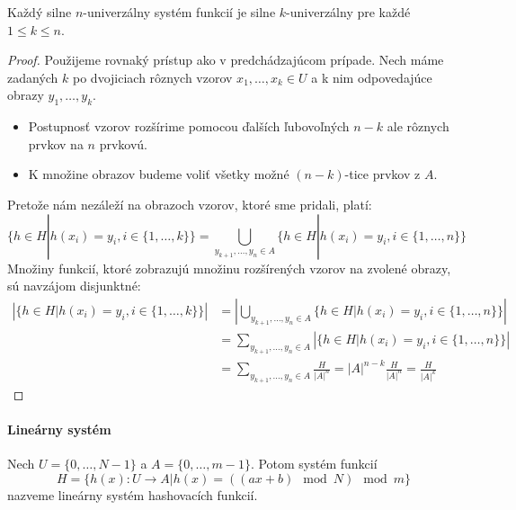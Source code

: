 \begin{remark}
Každý silne $n$-univerzálny systém funkcií je silne $k$-univerzálny pre každé $1 \leq k \leq n$.
\end{remark}
\begin{proof}
Použijeme rovnaký prístup ako v predchádzajúcom prípade. Nech máme zadaných $k$ po dvojiciach rôznych vzorov $x_1, \dots, x_k \in U$ a k nim odpovedajúce obrazy $y_1, \dots, y_k$. 
\begin{itemize}
\item Postupnosť vzorov rozšírime pomocou ďalších ľubovoľných $n - k$ ale rôznych prvkov na $n$ prvkovú. 
\item K množine obrazov budeme voliť všetky možné $(n-k)$-tice prvkov z $A$. 
\end{itemize}
Pretože nám nezáleží na obrazoch vzorov, ktoré sme pridali, platí:
\begin{displaymath}
\lbrace h \in H | h(x_i) = y_i, i \in \lbrace 1, \dots, k \rbrace \rbrace = \displaystyle \bigcup_{y_{k+1}, \dots, y_n \in A} \lbrace h \in H | h(x_i) = y_i, i \in \lbrace 1, \dots, n \rbrace \rbrace
\end{displaymath}
Množiny funkcií, ktoré zobrazujú množinu rozšírených vzorov na zvolené obrazy, sú navzájom disjunktné:
\begin{displaymath}
\begin{split}
\left| \lbrace h \in H | h(x_i) = y_i, i \in \lbrace 1, \dots, k \rbrace \rbrace \right| 
	& = \left| \displaystyle \bigcup_{y_{k+1}, \dots, y_n \in A} \lbrace h \in H | h(x_i) = y_i, i \in \lbrace 1, \dots, n \rbrace \rbrace \right|  \\
	& = \displaystyle \sum_{y_{k+1}, \dots, y_n \in A} \left| \lbrace h \in H | h(x_i) = y_i, i \in \lbrace 1, \dots, n \rbrace \rbrace \right| \\
	& = \displaystyle \sum_{y_{k+1}, \dots, y_n \in A} \frac{H}{{|A|}^{n}} = {|A|}^{n - k} \frac{H}{{|A|}^{n}} = \frac{H}{{|A|}^{k}}
\end{split}
\end{displaymath}
\end{proof}

\paragraph{Lineárny systém}
\begin{definition}
Nech $U = \{0, \dots, N - 1 \}$ a $A = \{0, \dots, m - 1\}$. Potom systém funkcií 
\[ H = \{h(x): U \rightarrow A | h(x) = ((ax + b) \mod N) \mod m\} \]
nazveme lineárny systém hashovacích funkcií.
\end{definition}

